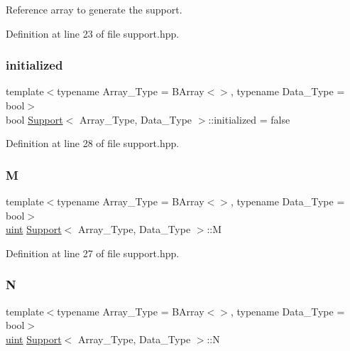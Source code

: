 Reference array to generate the support. 



Definition at line 23 of file support.\+hpp.

\mbox{\label{class_support_ac352c6473720fcdcd9895c48bd872ef5}} 
\subsubsection{\texorpdfstring{initialized}{initialized}}
{\footnotesize\ttfamily template$<$typename Array\+\_\+\+Type = B\+Array$<$$>$, typename Data\+\_\+\+Type = bool$>$ \\
bool \hyperlink{class_support}{Support}$<$ Array\+\_\+\+Type, Data\+\_\+\+Type $>$\+::initialized = false}



Definition at line 28 of file support.\+hpp.

\mbox{\label{class_support_ace1d46b871c67caa774ac2269930e97f}} 
\subsubsection{\texorpdfstring{M}{M}}
{\footnotesize\ttfamily template$<$typename Array\+\_\+\+Type = B\+Array$<$$>$, typename Data\+\_\+\+Type = bool$>$ \\
\hyperlink{typedefs_8hpp_a91ad9478d81a7aaf2593e8d9c3d06a14}{uint} \hyperlink{class_support}{Support}$<$ Array\+\_\+\+Type, Data\+\_\+\+Type $>$\+::M}



Definition at line 27 of file support.\+hpp.

\mbox{\label{class_support_ab15c7125d6b99ae15ec4dbb34c9ce9b6}} 
\subsubsection{\texorpdfstring{N}{N}}
{\footnotesize\ttfamily template$<$typename Array\+\_\+\+Type = B\+Array$<$$>$, typename Data\+\_\+\+Type = bool$>$ \\
\hyperlink{typedefs_8hpp_a91ad9478d81a7aaf2593e8d9c3d06a14}{uint} \hyperlink{class_support}{Support}$<$ Array\+\_\+\+Type, Data\+\_\+\+Type $>$\+::N}



